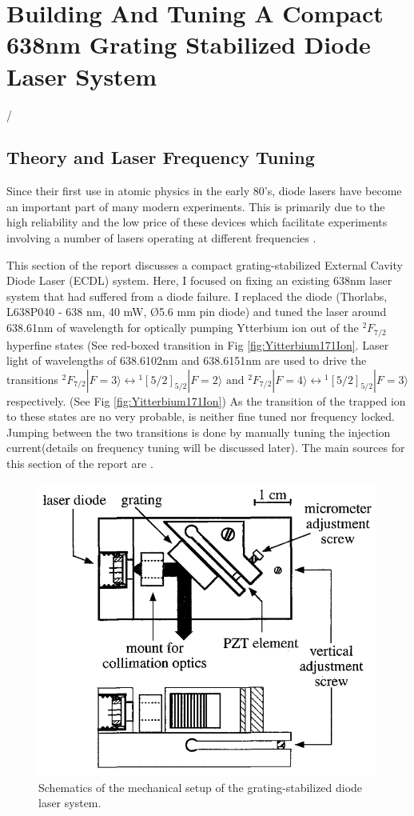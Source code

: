 \documentclass[12pt]{report}
\begin{document}
\chapter{Building And Tuning A Compact 638nm Grating Stabilized Diode Laser System}/
\section{Theory and Laser Frequency Tuning}
Since their first use in atomic physics in the early 80's, diode lasers have become an important part of many modern experiments. This is primarily due to the high reliability and the low price of these devices which facilitate experiments involving a number of lasers operating at different frequencies \cite{compactGratingDiodeLaser}.
\par
This section of the report discusses a compact grating-stabilized External Cavity Diode Laser (ECDL) system. Here, I focused on fixing an existing 638nm laser system that had suffered from a diode failure. I replaced the diode (Thorlabs, L638P040 - 638 nm, 40 mW, Ø5.6 mm pin diode) and tuned the laser around 638.61nm of wavelength for optically pumping Ytterbium ion out of the ${ }^2 F_{7 / 2}$ hyperfine states (See red-boxed transition in Fig \ref{fig:Yitterbium171Ion}. Laser light of wavelengths of 638.6102nm and 638.6151nm are used to drive the transitions ${ }^2 F_{7 / 2}|F=3\rangle \leftrightarrow{ }^1[5 / 2]_{5 / 2}|F=2\rangle \text { and }{ }^2 F_{7 / 2}|F=4\rangle \leftrightarrow{ }^1[5 / 2]_{5 / 2}|F=3\rangle$ respectively. (See Fig \ref{fig:Yitterbium171Ion}) As the transition of the trapped ion to these states are no very probable, is neither fine tuned nor frequency locked. Jumping between the two transitions is done by manually tuning the injection current(details on frequency tuning will be discussed later). The main sources for this section of the report are \cite{compactGratingDiodeLaser}\cite{fundamentalsOfPhotonics}.

\begin{figure}[H]
    \centering
    \includegraphics[width=.8\textwidth]{compactDiodeLaserSchematics.png}
    \caption{Schematics of the mechanical setup of the grating-stabilized diode laser system. \cite{compactGratingDiodeLaser}
    }
    \label{fig:compactDiodeLaserSchematics}
\end{figure}
\end{document}
